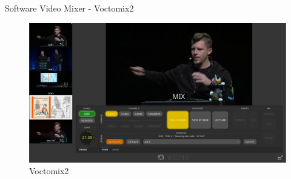 \documentclass[aspectratio=169]{beamer}
\begin{document}
%


\begin{frame}{Software Video Mixer - Voctomix2}
	\begin{figure} 
		\centering
		\includegraphics[width=.9\textwidth]{images/voctomix2_1.png}
		\caption{Voctomix2}
	\end{figure}
\end{frame}
\end{document}
